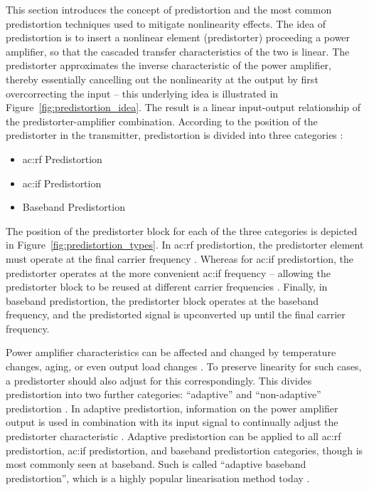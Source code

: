 This section introduces the concept of predistortion and the most common predistortion techniques used to mitigate nonlinearity effects. The idea of predistortion is to insert a nonlinear element (predistorter) proceeding a power amplifier, so that the cascaded transfer characteristics of the two is linear. The predistorter approximates the inverse characteristic of the power amplifier, thereby essentially cancelling out the nonlinearity at the output by first overcorrecting the input -- this underlying idea is illustrated in Figure~\ref{fig:predistortion_idea}. The result is a linear input-output relationship of the predistorter-amplifier combination. According to the position of the predistorter in the transmitter, predistortion is divided into three categories \cite{marsalek}:

\begin{itemize}
    \item \gls{ac:rf} Predistortion
    \item \gls{ac:if} Predistortion
    \item Baseband Predistortion
\end{itemize}

The position of the predistorter block for each of the three categories is depicted in Figure~\ref{fig:predistortion_types}. In \gls{ac:rf} predistortion, the predistorter element must operate at the final carrier frequency \cite{kenington}. Whereas for \gls{ac:if} predistortion, the predistorter operates at the more convenient \gls{ac:if} frequency -- allowing the predistorter block to be reused at different carrier frequencies \cite{kenington}. Finally, in baseband predistortion, the predistorter block operates at the baseband frequency, and the predistorted signal is upconverted up until the final carrier frequency. 

Power amplifier characteristics can be affected and changed by temperature changes, aging, or even output load changes \cite{durukal}. To preserve linearity for such cases, a predistorter should also adjust for this correspondingly. This divides predistortion into two further categories: ``adaptive'' and ``non-adaptive'' predistortion \cite{marsalek}. In adaptive predistortion, information on the power amplifier output is used in combination with its input signal to continually adjust the predistorter characteristic \cite{marsalek}. Adaptive predistortion can be applied to all \gls{ac:rf} predistortion, \gls{ac:if} predistortion, and baseband predistortion categories, though is most commonly seen at baseband. Such is called ``adaptive baseband predistortion'', which is a highly popular linearisation method today \cite{durukal}.

